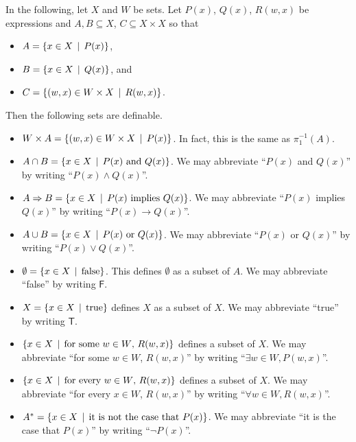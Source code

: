 \begin{vocabulary}
	In the following, let $X$ and $W$ be sets. Let $P(x)$, $Q(x)$, $R(w,x)$ be expressions and $A,B\subseteq X$, $C\subseteq X\times X$ so that
	\begin{itemize}
		\item $A = \{x\in X\,\mid\, P(x)\}$,
		\item $B = \{x\in X\,\mid\, Q(x)\}$, and
		\item $C = \{(w,x)\in W\times X\,\mid\, R(w,x)\}$.
	\end{itemize}
Then the following sets are definable. 
\begin{itemize}
\item $W\times A = \{(w,x)\in W\times X\,\mid\, P(x)\}$. In fact, this is the same 
as $\pi_1^{-1}(A)$.  

\item $A\cap B = \{x\in X\,\mid\, \text{$P(x)$ and $Q(x)$}\}$. We may abbreviate ``$P(x)$ and $Q(x)$'' by writing ``$P(x)\wedge Q(x)$''. 

\item $A\Rightarrow B = \{x\in X\,\mid\, \text{$P(x)$ implies $Q(x)$}\}$. We may abbreviate ``$P(x)$ implies $Q(x)$'' by writing ``$P(x)\to Q(x)$''.

\item $A\cup B = \{x\in X\,\mid\, \text{$P(x)$ or $Q(x)$}\}$. We may abbreviate ``$P(x)$ or $Q(x)$'' by writing ``$P(x)\vee Q(x)$''.
	
\item $\emptyset = \{x\in X\,\mid\, \text{false} \}$. This defines $\emptyset$ as a subset of $A$. We may abbreviate ``false'' by writing $\textsf{F}$.
	
\item $X = \{x\in X\,\mid\, \text{true}\}$ defines $X$ as a subset of $X$. We may abbreviate ``true'' by writing $\textsf{T}$.
	
\item $\{x\in X \,\mid\, \text{for some $w\in W$, $R(w,x)$}\}$ defines a subset of $X$. We may abbreviate ``for some $w\in W$, $R(w,x)$'' by writing ``$\exists w\in W, P(w,x)$''.
	
\item $\{x\in X \,\mid\, \text{for every $w\in W$, $R(w,x)$}\}$ defines a subset of $X$.  We may abbreviate ``for every $x\in W$, $R(w,x)$'' by writing ``$\forall w\in W, R(w,x)$''.

\item $A^* = \{x\in X\,\mid\, \text{it is not the case that $P(x)$}\}$.  We may abbreviate ``it is the case that $P(x)$'' by writing ``$\neg P(x)$''.
\end{itemize}
\end{vocabulary}

